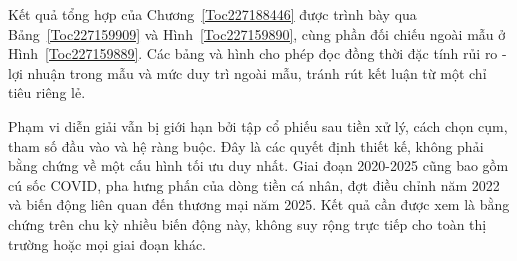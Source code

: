 \documentclass[12pt,a4paper,openany,oneside]{book}
\begin{document}
Kết quả tổng hợp của Chương~\ref{Toc227188446} được trình bày qua Bảng~\ref{Toc227159909} và Hình~\ref{Toc227159890}, cùng phần đối chiếu ngoài mẫu ở Hình~\ref{Toc227159889}. Các bảng và hình cho phép đọc đồng thời đặc tính rủi ro - lợi nhuận trong mẫu và mức duy trì ngoài mẫu, tránh rút kết luận từ một chỉ tiêu riêng lẻ.

Phạm vi diễn giải vẫn bị giới hạn bởi tập cổ phiếu sau tiền xử lý, cách chọn cụm, tham số đầu vào và hệ ràng buộc. Đây là các quyết định thiết kế, không phải bằng chứng về một cấu hình tối ưu duy nhất. Giai đoạn 2020-2025 cũng bao gồm cú sốc COVID, pha hưng phấn của dòng tiền cá nhân, đợt điều chỉnh năm 2022 và biến động liên quan đến thương mại năm 2025. Kết quả cần được xem là bằng chứng trên chu kỳ nhiều biến động này, không suy rộng trực tiếp cho toàn thị trường hoặc mọi giai đoạn khác.
\end{document}
